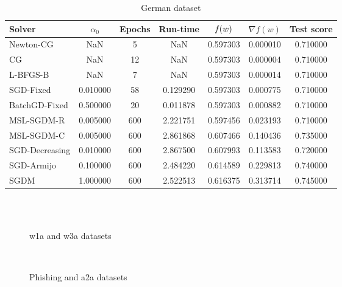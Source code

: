 \begin{table}
\caption{German dataset}
\label{tab:german-tab}
\centering
\begin{tabular}{lS[round-precision=3]S[drop-zero-decimal]S[round-precision=4]S[round-precision=6]S[exponent-mode=scientific]S[round-precision=6]}
\toprule
Solver & {$\alpha_0$} & {Epochs} & {Run-time} & {$\operatorname*{\mathit{f}}(w)$} & {$\nabla f(w)$} & {Test score} \\
\midrule
Newton-CG & NaN & 5 & NaN & 0.597303 & 0.000010 & 0.710000 \\
CG & NaN & 12 & NaN & 0.597303 & 0.000004 & 0.710000 \\
L-BFGS-B & NaN & 7 & NaN & 0.597303 & 0.000014 & 0.710000 \\
SGD-Fixed & 0.010000 & 58 & 0.129290 & 0.597303 & 0.000775 & 0.710000 \\
BatchGD-Fixed & 0.500000 & 20 & 0.011878 & 0.597303 & 0.000882 & 0.710000 \\
MSL-SGDM-R & 0.005000 & 600 & 2.221751 & 0.597456 & 0.023193 & 0.710000 \\
MSL-SGDM-C & 0.005000 & 600 & 2.861868 & 0.607466 & 0.140436 & 0.735000 \\
SGD-Decreasing & 0.010000 & 600 & 2.867500 & 0.607993 & 0.113583 & 0.720000 \\
SGD-Armijo & 0.100000 & 600 & 2.484220 & 0.614589 & 0.229813 & 0.740000 \\
SGDM & 1.000000 & 600 & 2.522513 & 0.616375 & 0.313714 & 0.745000 \\
\bottomrule
\end{tabular}
\end{table}

\begin{figure}
\centering
 \\
 \\
\caption[]{w1a and w3a datasets}
\label{fig:w1a-w3a}
\end{figure}

\begin{figure}
\centering
 \\
\caption[]{Phishing and a2a datasets}
\label{fig:phish-a2a}
\end{figure}

